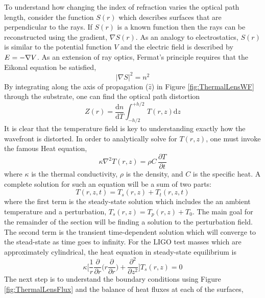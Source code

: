 	To understand how changing the index of refraction varies the optical path length, consider the function $S(r)$ which describes surfaces that are perpendicular to the rays. If $S(r)$ is a known function then the rays can be reconstructed using the gradient, $\nabla S(r)$.  As an analogy to electrostatics, $S(r)$ is similar to the potential function $V$ and the electric field is described by $\boldmath{E}=-\nabla V$.  As an extension of ray optics, Fermat's principle requires that the Eikonal equation be satisfied,
	\begin{equation}
	\vert \nabla S \vert^2 = n^2
	\end{equation}
	By integrating along the axis of propagation ($\hat{z}$) in Figure \ref{fig:ThermalLensWF} through the substrate, one can find the optical path distortion
	\begin{equation}\label{eq:thermoref}
	Z(r) =  \frac{\text{d}n}{\text{d}T} \int_{-h/2}^{+h/2} \, T(r,z) \text{d}z
	\end{equation}
	It is clear that the temperature field is key to understanding exactly how the wavefront is distorted. In order to analytically solve for $T(r,z)$, one must invoke the famous Heat equation,
	\begin{equation}\label{eq:heat_eq}
		\kappa \nabla^2 T(r,z) = \rho C\, \frac{\partial T}{\partial t} 
	\end{equation}
	where $\kappa$ is the thermal conductivity, $\rho$ is the density, and $C$ is the specific heat.  A complete solution for such an equation will be a sum of two parts: 
	\begin{equation}
	T(r,z,t) = T_{s}(r,z) + T_{t}(r,z,t)
	\end{equation} 
	where the first term is the steady-state solution which includes the an ambient temperature and a perturbation, $T_s(r,z) = T_p(r,z) + T_0$.  The main goal for the remainder of the section will be finding a solution to the perturbation field.  The second term is the transient time-dependent solution which will converge to the stead-state as time goes to infinity.  For the LIGO test masses which are approximately cylindrical, the heat equation in steady-state equilibrium is
	\begin{equation}
		\kappa \bigg[ \frac{1}{r} \frac{\partial}{\partial r} \bigg( r \frac{\partial}{\partial r}\bigg) +  \frac{\partial^2}{\partial z^2} \bigg] T_s(r,z) = 0
	\end{equation}
	The next step is to understand the boundary conditions using Figure \ref{fig:ThermalLensFlux} and the balance of heat fluxes at each of the surfaces,
